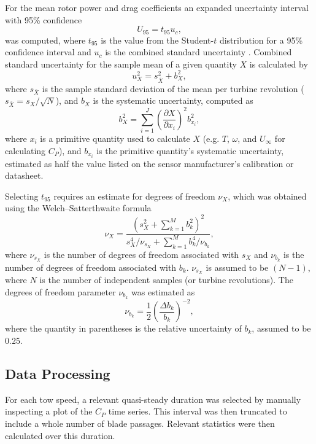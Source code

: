 \documentclass[10pt,letterpaper]{article}
\begin{document}
For the mean rotor power and drag coefficients an expanded uncertainty interval
with 95\% confidence
\begin{equation}
    U_{95} = t_{95} u_c,
\end{equation}
was computed, where $t_{95}$ is the value from the Student-$t$ distribution for
a 95\% confidence interval and $u_c$ is the combined standard uncertainty
\cite{ColemanSteele}. Combined standard uncertainty for the sample mean of a
given quantity $X$ is calculated by
\begin{equation}
    u_X^2 = s_{\bar{X}}^2 + b_X^2,
\end{equation}
where $s_{\bar{X}}$ is the sample standard deviation of the mean per turbine
revolution ($s_{\bar{X}} = s_X/\sqrt{N}$), and $b_X$ is the systematic
uncertainty, computed as
\begin{equation}
    b_{X}^2 = \sum_{i=1}^J \left( \frac{\partial X}{\partial x_i} \right)^2
    b_{x_i}^2,
\end{equation}
where $x_i$ is a primitive quantity used to calculate $X$ (e.g. $T$, $\omega$,
and $U_\infty$ for calculating $C_P$), and $b_{x_i}$ is the primitive quantity's
systematic uncertainty, estimated as half the value listed on the sensor
manufacturer's calibration or datasheet.

Selecting $t_{95}$ requires an estimate for degrees of freedom $\nu_X$, which
was obtained using the Welch--Satterthwaite formula
\begin{equation}
    \nu_X = \frac{\left(s_X^2 + \sum_{k=1}^M b_k^2 \right)^2} {s_X^4/\nu_{s_X} +
    \sum_{k=1}^M b_k^4/\nu_{b_k}},
\end{equation}
where $\nu_{s_X}$ is the number of degrees of freedom associated with $s_X$ and
$\nu_{b_k}$ is the number of degrees of freedom associated with $b_k$.
$\nu_{s_X}$ is assumed to be $(N-1)$, where $N$ is the number of independent
samples (or turbine revolutions). The degrees of freedom parameter $\nu_{b_k}$
was estimated as
\begin{equation}
    \nu_{b_k} = \frac{1}{2} \left( \frac{\Delta b_k}{b_k} \right)^{-2},
\end{equation}
where the quantity in parentheses is the relative uncertainty of $b_k$, assumed
to be 0.25.


\subsection*{Data Processing}

For each tow speed, a relevant quasi-steady duration was selected by manually
inspecting a plot of the $C_P$ time series. This interval was then truncated to
include a whole number of blade passages. Relevant statistics were then
calculated over this duration.
\end{document}
